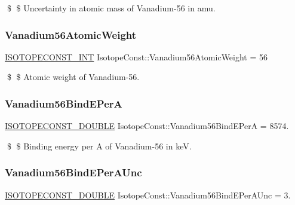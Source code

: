 \$ \$ Uncertainty in atomic mass of Vanadium-\/56 in amu. \mbox{\label{group___isotope_const-_vanadium-_v56_gaf8926a4d003ce58c6225087fbe4c8455}} 
\subsubsection{\texorpdfstring{Vanadium56\+Atomic\+Weight}{Vanadium56AtomicWeight}}
{\footnotesize\ttfamily \mbox{\hyperlink{group___isotope_const-_macros_ga5f18360b3e99483a35c32d789e62621c}{I\+S\+O\+T\+O\+P\+E\+C\+O\+N\+S\+T\+\_\+\+I\+NT}} Isotope\+Const\+::\+Vanadium56\+Atomic\+Weight = 56}

\$ \$ Atomic weight of Vanadium-\/56. \mbox{\label{group___isotope_const-_vanadium-_v56_ga99c21769d136260cfefc479cd06f606d}} 
\subsubsection{\texorpdfstring{Vanadium56\+Bind\+E\+PerA}{Vanadium56BindEPerA}}
{\footnotesize\ttfamily \mbox{\hyperlink{group___isotope_const-_macros_ga8f45a7272ce02c0b4c65c44636ed719a}{I\+S\+O\+T\+O\+P\+E\+C\+O\+N\+S\+T\+\_\+\+D\+O\+U\+B\+LE}} Isotope\+Const\+::\+Vanadium56\+Bind\+E\+PerA = 8574.}

\$ \$ Binding energy per A of Vanadium-\/56 in keV. \mbox{\label{group___isotope_const-_vanadium-_v56_gaf371d2c6a920fea8f26af5fb39a7ac52}} 
\subsubsection{\texorpdfstring{Vanadium56\+Bind\+E\+Per\+A\+Unc}{Vanadium56BindEPerAUnc}}
{\footnotesize\ttfamily \mbox{\hyperlink{group___isotope_const-_macros_ga8f45a7272ce02c0b4c65c44636ed719a}{I\+S\+O\+T\+O\+P\+E\+C\+O\+N\+S\+T\+\_\+\+D\+O\+U\+B\+LE}} Isotope\+Const\+::\+Vanadium56\+Bind\+E\+Per\+A\+Unc = 3.}

